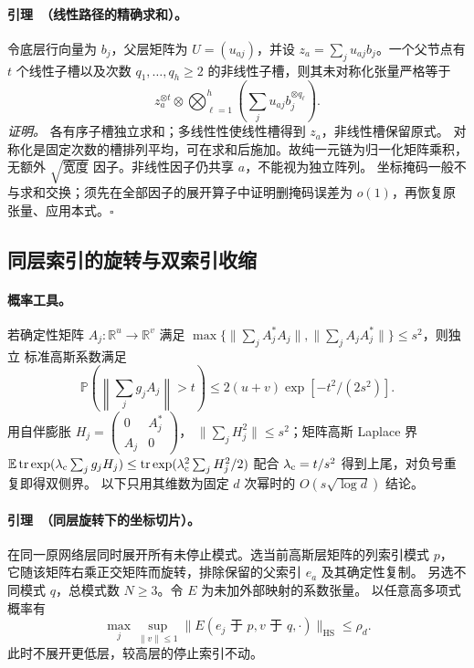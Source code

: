 \documentclass[a4paper]{tufte-handout}
\begin{document}
\begin{fullwidth}
\paragraph{引理~\thelemma（线性路径的精确求和）。}
\label{fp:core-linear}
令底层行向量为 $b_j$，父层矩阵为 $U=(u_{aj})$，并设
$z_a=\sum_ju_{aj}b_j$。一个父节点有 $t$ 个线性子槽以及次数
$q_1,\ldots,q_h\geq2$ 的非线性子槽，则其未对称化张量严格等于
\begin{equation}
 z_a^{\otimes t}\otimes
 \bigotimes_{\ell=1}^h\left(\sum_j u_{aj}b_j^{\otimes q_\ell}\right).
 \label{fp:core-linear-identity}
\end{equation}
\emph{证明。} 各有序子槽独立求和；多线性性使线性槽得到 $z_a$，非线性槽保留原式。
对称化是固定次数的槽排列平均，可在求和后施加。故纯一元链为归一化矩阵乘积，无额外
$\sqrt{\text{宽度}}$ 因子。非线性因子仍共享 $a$，不能视为独立阵列。
坐标掩码一般不与求和交换；须先在全部因子的展开算子中证明删掩码误差为
$o(1)$，再恢复原张量、应用本式。\hfill$\square$

\subsection{同层索引的旋转与双索引收缩}
\label{fp:core-fresh-section}

\paragraph{概率工具。}
若确定性矩阵 $A_j:\mathbb R^u\to\mathbb R^v$ 满足
$\max\{\|\sum_jA_j^*A_j\|,\|\sum_jA_jA_j^*\|\}\leq s^2$，则独立
标准高斯系数满足
\[
 \mathbb P\!\left(\left\|\sum_jg_jA_j\right\|>t\right)
 \leq2(u+v)\exp[-t^2/(2s^2)].
\]
用自伴膨胀
$H_j=\left(\begin{smallmatrix}0&A_j^*\\ A_j&0\end{smallmatrix}\right)$，
$\|\sum_jH_j^2\|\leq s^2$；矩阵高斯 Laplace 界
$\mathbb E\operatorname{tr}\exp(\lambda_{\rm c}\sum_jg_jH_j)
\leq\operatorname{tr}\exp(\lambda_{\rm c}^2\sum_jH_j^2/2)$
配合 $\lambda_{\rm c}=t/s^2$ 得到上尾，对负号重复即得双侧界。
以下只用其维数为固定 $d$ 次幂时的 $O(s\sqrt{\log d})$ 结论。

\paragraph{引理~\thelemma（同层旋转下的坐标切片）。}
\label{fp:core-fresh}
在同一原网络层同时展开所有未停止模式。选当前高斯层矩阵的列索引模式 $p$，
它随该矩阵右乘正交矩阵而旋转，排除保留的父索引 $e_a$ 及其确定性复制。
另选不同模式 $q$，总模式数 $N\ge3$。令 $E$ 为未加外部映射的系数张量。
以任意高多项式概率有
\begin{equation}
 \max_j\sup_{\|v\|\leq1}
 \|E(e_j\text{ 于 }p,v\text{ 于 }q,\cdot)\|_{\mathrm{HS}}
 \leq\rho_d.
 \label{fp:core-fresh-slice}
\end{equation}
此时不展开更低层，较高层的停止索引不动。


\end{fullwidth}
\end{document}

